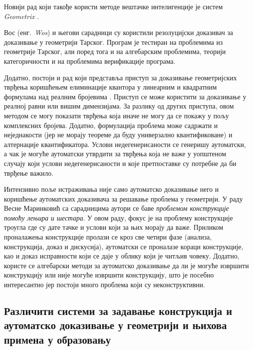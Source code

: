 Новији рад који такође користи методе вештачке интелигенције је систем
\emph{Geometrix} \cite{gressier2013}.

Вос (енг.~\emph{Wos}) и његови сарадници \cite{mccharen2000problems}
су користили резолуцијски доказивач за доказивање у геометрији
Тарског. Програм је тестиран на проблемима из геометрије Тарског, али
поред тога и на алгебарским проблемима, теорији категоричности и на
проблемима верификације програма.

Додатно, постоји и рад који представља приступ за доказивање
геометријских тврђења коришћењем елиминације квантора у линеарним и
квадратним формулама над реалним бројевима
\cite{dolzmann1998new}. Приступ се може користити за доказивање у
реалној равни или вишим димензијама. За разлику од других приступа,
овом методом се могу показати тврђења која иначе не могу да се покажу
у пољу комплексних бројева. Додатно, формулација проблема може
садржати и неједнакости (јер не морају теореме да буду универзално
квантификоване) и алтернације квантификатора. Услови недегенерисаности 
се генеришу аутоматски, а чак је могуће аутоматски утврдити за тврђења 
која не важе у уопштеном случају који услови недегенерисаности и које
претпоставке су потребне да би тврђење важило.

Интензивно поље истраживања није само аутоматско доказивање него и
коришћење аутоматских доказивача за решавање проблема у геометрији. У
раду Весне Маринковић са сарадницима \cite{marinkovic2014computer}
аутори се баве \emph{проблемом конструкције помоћу лењира и
  шестара}. У овом раду, фокус је на проблему конструкције троугла где
су дате тачке и услови који за њих морају да важе. Приликом
проналажења конструкције пролази се кроз све четири фазе (анализа,
конструкција, доказ и дискусија), аутоматски се проналазе кораци
конструкције, као и доказ исправности који се даје у облику који је
читљив човеку. Додатно, користе се алгебарски методи за аутоматско
доказивање да ли је могуће извршити конструкцију или није могуће
извршити конструкцију, што је посебно интересантно јер постоји много
проблема који су неконструктивни.


\subsection{Различити системи за задавање конструкција и аутоматско доказивање у геометрији и њихова примена у образовању}

